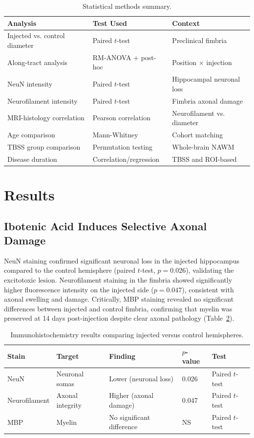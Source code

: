 \documentclass[11pt]{article}
\begin{document}
\begin{table}[htbp]
\centering
\caption{Statistical methods summary.}
\label{tab:stats}
\begin{tabular}{lll}
\toprule
Analysis & Test Used & Context \\
\midrule
Injected vs. control diameter & Paired $t$-test & Preclinical fimbria \\
Along-tract analysis & RM-ANOVA + post-hoc & Position $\times$ injection \\
NeuN intensity & Paired $t$-test & Hippocampal neuronal loss \\
Neurofilament intensity & Paired $t$-test & Fimbria axonal damage \\
MRI-histology correlation & Pearson correlation & Neurofilament vs. diameter \\
Age comparison & Mann-Whitney & Cohort matching \\
TBSS group comparison & Permutation testing & Whole-brain NAWM \\
Disease duration & Correlation/regression & TBSS and ROI-based \\
\bottomrule
\end{tabular}
\end{table}

\section{Results}

\subsection{Ibotenic Acid Induces Selective Axonal Damage}

NeuN staining confirmed significant neuronal loss in the injected hippocampus compared to the control hemisphere (paired $t$-test, $p = 0.026$), validating the excitotoxic lesion. Neurofilament staining in the fimbria showed significantly higher fluorescence intensity on the injected side ($p = 0.047$), consistent with axonal swelling and damage. Critically, MBP staining revealed no significant differences between injected and control fimbria, confirming that myelin was preserved at 14 days post-injection despite clear axonal pathology (Table~\ref{tab:histology}).

\begin{table}[htbp]
\centering
\caption{Immunohistochemistry results comparing injected versus control hemispheres.}
\label{tab:histology}
\begin{tabular}{lllll}
\toprule
Stain & Target & Finding & $p$-value & Test \\
\midrule
NeuN & Neuronal somas & Lower (neuronal loss) & 0.026 & Paired $t$-test \\
Neurofilament & Axonal integrity & Higher (axonal damage) & 0.047 & Paired $t$-test \\
MBP & Myelin & No significant difference & NS & Paired $t$-test \\
\bottomrule
\end{tabular}
\end{table}
\end{document}
